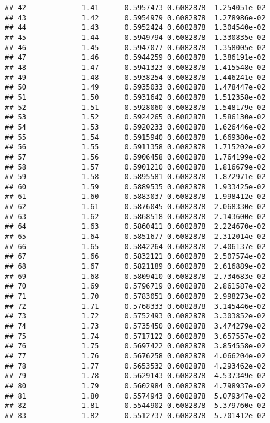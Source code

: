 \documentclass[
]{article}
\begin{document}
\begin{verbatim}
## 42             1.41      0.5957473 0.6082878  1.254051e-02
## 43             1.42      0.5954979 0.6082878  1.278986e-02
## 44             1.43      0.5952424 0.6082878  1.304540e-02
## 45             1.44      0.5949794 0.6082878  1.330835e-02
## 46             1.45      0.5947077 0.6082878  1.358005e-02
## 47             1.46      0.5944259 0.6082878  1.386191e-02
## 48             1.47      0.5941323 0.6082878  1.415548e-02
## 49             1.48      0.5938254 0.6082878  1.446241e-02
## 50             1.49      0.5935033 0.6082878  1.478447e-02
## 51             1.50      0.5931642 0.6082878  1.512358e-02
## 52             1.51      0.5928060 0.6082878  1.548179e-02
## 53             1.52      0.5924265 0.6082878  1.586130e-02
## 54             1.53      0.5920233 0.6082878  1.626446e-02
## 55             1.54      0.5915940 0.6082878  1.669380e-02
## 56             1.55      0.5911358 0.6082878  1.715202e-02
## 57             1.56      0.5906458 0.6082878  1.764199e-02
## 58             1.57      0.5901210 0.6082878  1.816679e-02
## 59             1.58      0.5895581 0.6082878  1.872971e-02
## 60             1.59      0.5889535 0.6082878  1.933425e-02
## 61             1.60      0.5883037 0.6082878  1.998412e-02
## 62             1.61      0.5876045 0.6082878  2.068330e-02
## 63             1.62      0.5868518 0.6082878  2.143600e-02
## 64             1.63      0.5860411 0.6082878  2.224670e-02
## 65             1.64      0.5851677 0.6082878  2.312014e-02
## 66             1.65      0.5842264 0.6082878  2.406137e-02
## 67             1.66      0.5832121 0.6082878  2.507574e-02
## 68             1.67      0.5821189 0.6082878  2.616889e-02
## 69             1.68      0.5809410 0.6082878  2.734683e-02
## 70             1.69      0.5796719 0.6082878  2.861587e-02
## 71             1.70      0.5783051 0.6082878  2.998273e-02
## 72             1.71      0.5768333 0.6082878  3.145446e-02
## 73             1.72      0.5752493 0.6082878  3.303852e-02
## 74             1.73      0.5735450 0.6082878  3.474279e-02
## 75             1.74      0.5717122 0.6082878  3.657557e-02
## 76             1.75      0.5697422 0.6082878  3.854558e-02
## 77             1.76      0.5676258 0.6082878  4.066204e-02
## 78             1.77      0.5653532 0.6082878  4.293462e-02
## 79             1.78      0.5629143 0.6082878  4.537349e-02
## 80             1.79      0.5602984 0.6082878  4.798937e-02
## 81             1.80      0.5574943 0.6082878  5.079347e-02
## 82             1.81      0.5544902 0.6082878  5.379760e-02
## 83             1.82      0.5512737 0.6082878  5.701412e-02

\end{verbatim}
\end{document}
